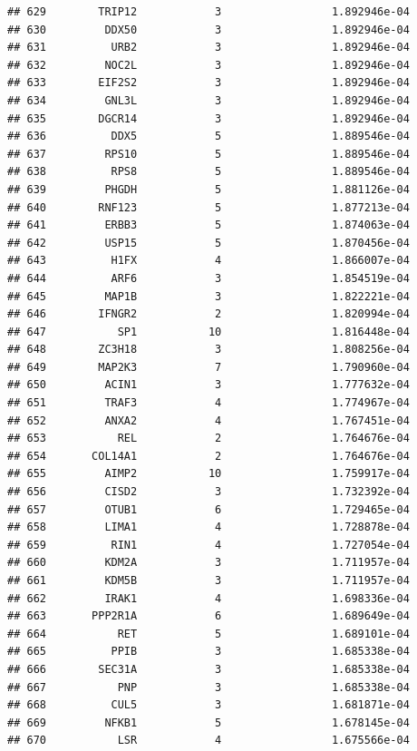 \documentclass[
]{article}
\begin{document}
\begin{verbatim}
## 629        TRIP12            3                 1.892946e-04
## 630         DDX50            3                 1.892946e-04
## 631          URB2            3                 1.892946e-04
## 632         NOC2L            3                 1.892946e-04
## 633        EIF2S2            3                 1.892946e-04
## 634         GNL3L            3                 1.892946e-04
## 635        DGCR14            3                 1.892946e-04
## 636          DDX5            5                 1.889546e-04
## 637         RPS10            5                 1.889546e-04
## 638          RPS8            5                 1.889546e-04
## 639         PHGDH            5                 1.881126e-04
## 640        RNF123            5                 1.877213e-04
## 641         ERBB3            5                 1.874063e-04
## 642         USP15            5                 1.870456e-04
## 643          H1FX            4                 1.866007e-04
## 644          ARF6            3                 1.854519e-04
## 645         MAP1B            3                 1.822221e-04
## 646        IFNGR2            2                 1.820994e-04
## 647           SP1           10                 1.816448e-04
## 648        ZC3H18            3                 1.808256e-04
## 649        MAP2K3            7                 1.790960e-04
## 650         ACIN1            3                 1.777632e-04
## 651         TRAF3            4                 1.774967e-04
## 652         ANXA2            4                 1.767451e-04
## 653           REL            2                 1.764676e-04
## 654       COL14A1            2                 1.764676e-04
## 655         AIMP2           10                 1.759917e-04
## 656         CISD2            3                 1.732392e-04
## 657         OTUB1            6                 1.729465e-04
## 658         LIMA1            4                 1.728878e-04
## 659          RIN1            4                 1.727054e-04
## 660         KDM2A            3                 1.711957e-04
## 661         KDM5B            3                 1.711957e-04
## 662         IRAK1            4                 1.698336e-04
## 663       PPP2R1A            6                 1.689649e-04
## 664           RET            5                 1.689101e-04
## 665          PPIB            3                 1.685338e-04
## 666        SEC31A            3                 1.685338e-04
## 667           PNP            3                 1.685338e-04
## 668          CUL5            3                 1.681871e-04
## 669         NFKB1            5                 1.678145e-04
## 670           LSR            4                 1.675566e-04

\end{verbatim}
\end{document}
